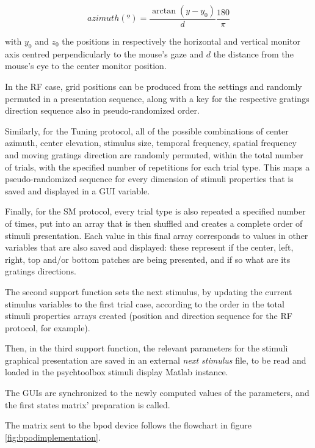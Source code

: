 \begin{equation}
azimuth(º)= \dfrac{\arctan(y-y_0)}{d}\dfrac{180}{\pi}
\end{equation}

with $y_0$ and $z_0$ the positions in respectively the horizontal and vertical monitor axis centred perpendicularly to the mouse's gaze and $d$ the distance from the mouse's eye to the center monitor position.

In the RF case, grid positions can be produced from the settings and randomly permuted in a presentation sequence, along with a key for the respective gratings direction sequence also in pseudo-randomized order.

Similarly, for the Tuning protocol, all of the possible combinations of center azimuth, center elevation, stimulus size, temporal frequency, spatial frequency and moving gratings direction are randomly permuted, within the total number of trials, with the specified number of repetitions for each trial type. This maps a pseudo-randomized sequence for every dimension of stimuli properties that is saved and displayed in a GUI variable.

Finally, for the SM protocol, every trial type is also repeated a specified number of times, put into an array that is then shuffled and creates a complete order of stimuli presentation. Each value in this final array corresponds to values in other variables that are also saved and displayed: these represent if the center, left, right, top and/or bottom patches are being presented, and if so what are its gratings directions.

The second support function sets the next stimulus, by updating the current stimulus variables to the first trial case, according to the order in the total stimuli properties arrays created (position and direction sequence for the RF protocol, for example).

Then, in the third support function, the relevant parameters for the stimuli graphical presentation are saved in an external \textit{next stimulus} file, to be read and loaded in the psychtoolbox stimuli display Matlab instance.

The GUIs are synchronized to the newly computed values of the parameters, and the first states matrix' preparation is called.

The matrix sent to the bpod device follows the flowchart in figure \ref{fig:bpodimplementation}.

